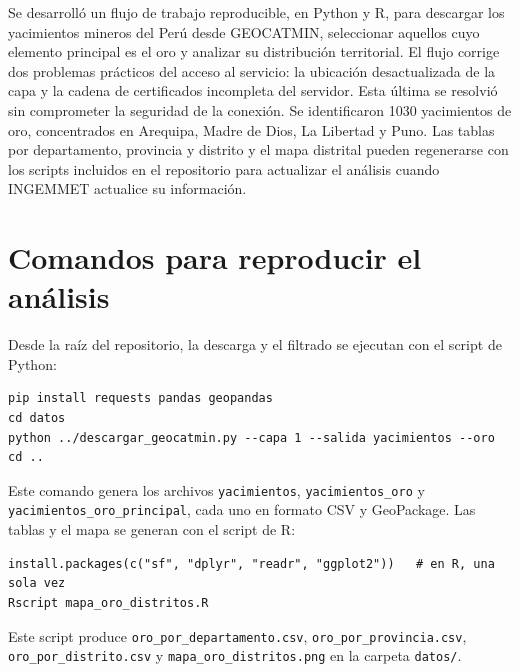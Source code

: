 \documentclass[man,12pt,a4paper,floatsintext,donotrepeattitle]{apa7}
\begin{document}
Se desarrolló un flujo de trabajo reproducible, en Python y R, para descargar los
yacimientos mineros del Perú desde GEOCATMIN, seleccionar aquellos cuyo
elemento principal es el oro y analizar su distribución territorial. El flujo
corrige dos problemas prácticos del acceso al servicio: la ubicación desactualizada
de la capa y la cadena de certificados incompleta del servidor. Esta última se
resolvió sin comprometer la seguridad de la conexión. Se identificaron 1030
yacimientos de oro, concentrados en Arequipa, Madre de Dios, La Libertad y Puno.
Las tablas por departamento, provincia y distrito y el mapa distrital pueden
regenerarse con los scripts incluidos en el repositorio para actualizar el
análisis cuando INGEMMET actualice su información.

\printbibliography

\appendix

\section{Comandos para reproducir el análisis}

Desde la raíz del repositorio, la descarga y el filtrado se ejecutan con el
script de Python:

\begin{lstlisting}
pip install requests pandas geopandas
cd datos
python ../descargar_geocatmin.py --capa 1 --salida yacimientos --oro
cd ..
\end{lstlisting}

Este comando genera los archivos \texttt{yacimientos}, \texttt{yacimientos\_oro}
y \texttt{yacimientos\_oro\_principal}, cada uno en formato CSV y GeoPackage.
Las tablas y el mapa se generan con el script de R:

\begin{lstlisting}
install.packages(c("sf", "dplyr", "readr", "ggplot2"))   # en R, una sola vez
Rscript mapa_oro_distritos.R
\end{lstlisting}

Este script produce \texttt{oro\_por\_departamento.csv},
\texttt{oro\_por\_provincia.csv}, \texttt{oro\_por\_distrito.csv} y
\texttt{mapa\_oro\_distritos.png} en la carpeta \texttt{datos/}.
\end{document}
